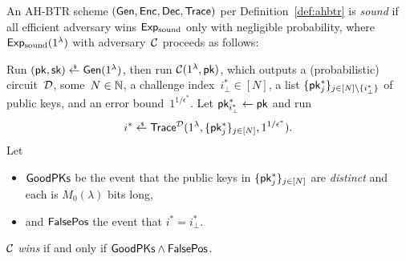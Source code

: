 \begin{definition}[soundness]\label{def:soundness}
An AH-BTR scheme $(\Gen,\Enc,\Dec,\Trace)$ per Definition~\ref{def:ahbtr} is \emph{sound}
if all efficient adversary wins $\ExpSound$ only with negligible probability,
where $\ExpSound(1^\lambda)$ with adversary~${\mathcal{C}}$ proceeds as follows:
\begin{security}
Run ${(\pk,\sk)\draws\Gen(1^\lambda)}$,
then run $\scriptC(1^\lambda,\pk)$, which outputs
a (probabilistic) circuit~${\mathcal{D}}$,
some~${N\in{\mathbb{N}}}$,
a challenge index~${i_\bot^\ast\in[N]}$,
a list $\{\pk^\ast_j\}_{j\in[N]\setminus\{i_\bot^\ast\}}$ of public keys, and
an error bound~$1^{1/\epsilon^\ast}$.
Let ${\pk^\ast_{i_\bot^\ast}\gets\pk}$ and run
\begin{align*}
i^\ast\draws\Trace^\scriptD(1^\lambda,\{\pk^\ast_j\}_{j\in[N]},1^{1/\epsilon^\ast}).
\end{align*}
Let
\begin{itemize}
\item $\GoodPKs$ be the event that the public keys in $\{\pk^\ast_j\}_{j\in[N]}$ are \emph{distinct} and each is $M_0(\lambda)$ bits long,
\item and $\FalsePos$ the event that ${i^\ast=i_\bot^\ast}$.
\end{itemize}
${\mathcal{C}}$ \emph{wins} if and only if ${\GoodPKs\wedge\FalsePos}$.
\end{security}
\end{definition}
